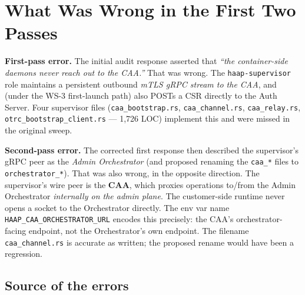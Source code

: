 \documentclass[11pt, a4paper]{article}
\newcommand{\code}[1]{\texttt{\small #1}}
\begin{document}
\clearpage

\section{What Was Wrong in the First Two Passes}

\begin{warnbox}
\textbf{First-pass error.} The initial audit response asserted that
\emph{``the container-side daemons never reach out to the CAA.''} That
was wrong. The \code{haap-supervisor} role maintains a persistent
outbound \emph{mTLS gRPC stream to the CAA}, and (under the WS-3
first-launch path) also POSTs a CSR directly to the Auth Server. Four
supervisor files (\code{caa\_bootstrap.rs}, \code{caa\_channel.rs},
\code{caa\_relay.rs}, \code{otrc\_bootstrap\_client.rs} --- 1,726 LOC)
implement this and were missed in the original sweep.
\end{warnbox}

\begin{warnbox}
\textbf{Second-pass error.} The corrected first response then described
the supervisor's gRPC peer as the \emph{Admin Orchestrator} (and proposed
renaming the \code{caa\_*} files to \code{orchestrator\_*}). That was
also wrong, in the opposite direction. The supervisor's wire peer is
the \textbf{CAA}, which proxies operations to/from the Admin Orchestrator
\emph{internally on the admin plane}. The customer-side runtime never
opens a socket to the Orchestrator directly. The env var name
\code{HAAP\_CAA\_ORCHESTRATOR\_URL} encodes this precisely: the CAA's
orchestrator-facing endpoint, not the Orchestrator's own endpoint. The
filename \code{caa\_channel.rs} is accurate as written; the proposed
rename would have been a regression.
\end{warnbox}

\subsection{Source of the errors}
\end{document}
